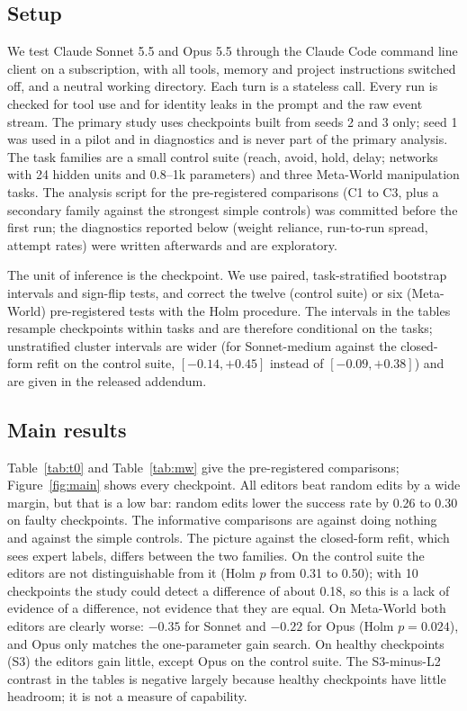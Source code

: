 \documentclass[conference]{IEEEtran}
\begin{document}
\subsection{Setup}
We test Claude Sonnet 5.5 and Opus 5.5 through the Claude Code command line client on a subscription, with all tools, memory and project instructions switched off, and a neutral working directory. Each turn is a stateless call. Every run is checked for tool use and for identity leaks in the prompt and the raw event stream. The primary study uses checkpoints built from seeds 2 and 3 only; seed 1 was used in a pilot and in diagnostics and is never part of the primary analysis. The task families are a small control suite (reach, avoid, hold, delay; networks with 24 hidden units and 0.8--1k parameters) and three Meta-World manipulation tasks. The analysis script for the pre-registered comparisons (C1 to C3, plus a secondary family against the strongest simple controls) was committed before the first run; the diagnostics reported below (weight reliance, run-to-run spread, attempt rates) were written afterwards and are exploratory.

The unit of inference is the checkpoint. We use paired, task-stratified bootstrap intervals and sign-flip tests, and correct the twelve (control suite) or six (Meta-World) pre-registered tests with the Holm procedure. The intervals in the tables resample checkpoints within tasks and are therefore conditional on the tasks; unstratified cluster intervals are wider (for Sonnet-medium against the closed-form refit on the control suite, $[-0.14, +0.45]$ instead of $[-0.09, +0.38]$) and are given in the released addendum.

\subsection{Main results}
Table~\ref{tab:t0} and Table~\ref{tab:mw} give the pre-registered comparisons; Figure~\ref{fig:main} shows every checkpoint. All editors beat random edits by a wide margin, but that is a low bar: random edits lower the success rate by 0.26 to 0.30 on faulty checkpoints. The informative comparisons are against doing nothing and against the simple controls. The picture against the closed-form refit, which sees expert labels, differs between the two families. On the control suite the editors are not distinguishable from it (Holm $p$ from 0.31 to 0.50); with 10 checkpoints the study could detect a difference of about 0.18, so this is a lack of evidence of a difference, not evidence that they are equal. On Meta-World both editors are clearly worse: $-0.35$ for Sonnet and $-0.22$ for Opus (Holm $p=0.024$), and Opus only matches the one-parameter gain search. On healthy checkpoints (S3) the editors gain little, except Opus on the control suite. The S3-minus-L2 contrast in the tables is negative largely because healthy checkpoints have little headroom; it is not a measure of capability.
\end{document}
